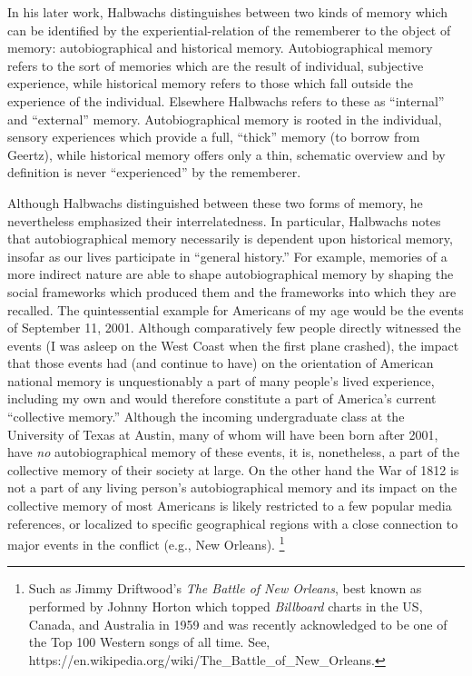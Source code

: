 In his later work, Halbwachs distinguishes between two kinds of memory
which can be identified by the experiential-relation of the rememberer
to the object of memory: autobiographical and historical
memory.\autocite[52]{halbwachs1980} Autobiographical memory refers to
the sort of memories which are the result of individual, subjective
experience, while historical memory refers to those which fall outside
the experience of the individual. Elsewhere Halbwachs refers to these as
``internal'' and ``external'' memory. Autobiographical memory is rooted
in the individual, sensory experiences which provide a full, ``thick''
memory (to borrow from Geertz), while historical memory offers only a
thin, schematic overview and by definition is never ``experienced'' by
the rememberer.

Although Halbwachs distinguished between these two forms of memory, he
nevertheless emphasized their interrelatedness. In particular, Halbwachs
notes that autobiographical memory necessarily is dependent upon
historical memory, insofar as our lives participate in ``general
history.''\autocite[52]{halbwachs1980} For example, memories of a more
indirect nature are able to shape autobiographical memory by shaping the
social frameworks which produced them and the frameworks into which they
are recalled. The quintessential example for Americans of my age would
be the events of September 11, 2001. Although comparatively few people
directly witnessed the events (I was asleep on the West Coast when the
first plane crashed), the impact that those events had (and continue to
have) on the orientation of American national memory is unquestionably a
part of many people's lived experience, including my own and would
therefore constitute a part of America's current ``collective memory.''
Although the incoming undergraduate class at the University of Texas at
Austin, many of whom will have been born after 2001, have \emph{no}
autobiographical memory of these events, it is, nonetheless, a part of
the collective memory of their society at large. On the other hand the
War of 1812 is not a part of any living person's autobiographical memory
and its impact on the collective memory of most Americans is likely
restricted to a few popular media references, or localized to specific
geographical regions with a close connection to major events in the
conflict (e.g., New Orleans). \footnote{Such as Jimmy Driftwood's
  \emph{The Battle of New Orleans}, best known as performed by Johnny
  Horton which topped \emph{Billboard} charts in the US, Canada, and
  Australia in 1959 and was recently acknowledged to be one of the Top
  100 Western songs of all time. See,
  https://en.wikipedia.org/wiki/The\_Battle\_of\_New\_Orleans.}

